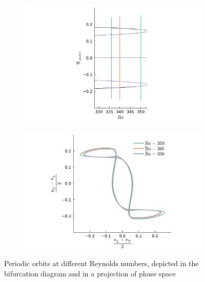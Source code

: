 \begin{figure}[!h]
  \begin{subfigure}[b]{0.42\textwidth}
  \centering
  \includegraphics[trim={3cm 0 4.6cm 0},clip,width=\textwidth]{figs/orbits_bif_diag64x64.pdf}
  \end{subfigure}
  \begin{subfigure}[b]{0.58\textwidth}
  \centering
  \includegraphics[trim={1cm 0cm 1cm 0cm},clip,width=\textwidth]{figs/orbits64x64.pdf}
  \end{subfigure}
  \caption{Periodic orbits at different Reynolds numbers, depicted in the
    bifurcation diagram and in a projection of phase space} 
  \label{fig:orbits}
\end{figure}


